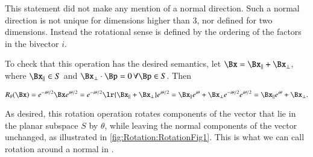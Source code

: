 This statement did not make any mention of a normal direction.
Such a normal direction is not unique for dimensions higher than 3, nor defined for two dimensions.
Instead the rotational sense is defined by the ordering of the factors in the bivector \( i \).

To check that this operation has the desired semantics,
let \( \Bx = \Bx_\parallel + \Bx_\perp \), where \( \Bx_\parallel \in S \) and \( \Bx_\perp \cdot \Bp = 0 \,\forall \Bp \in S \).  Then

\begin{dmath}\label{eqn:generalRotation:1880}
R_\theta(\Bx)
=
e^{ - i \theta/2 } \Bx e^{ i\theta/2 }
=
e^{ - i \theta/2 } \lr{ \Bx_\parallel + \Bx_\perp } e^{ i\theta/2 }
=
\Bx_\parallel e^{ i\theta } +
\Bx_\perp e^{ - i \theta/2 } e^{ i\theta/2 }
=
\Bx_\parallel e^{ i\theta } + \Bx_\perp.
\end{dmath}

As desired, this rotation operation
rotates components of the vector that lie in the planar subspace \( S \) by \( \theta \), while leaving the normal components of the vector unchanged, as illustrated in \cref{fig:Rotation:RotationFig1}.  This is what we can call rotation around a normal in .

